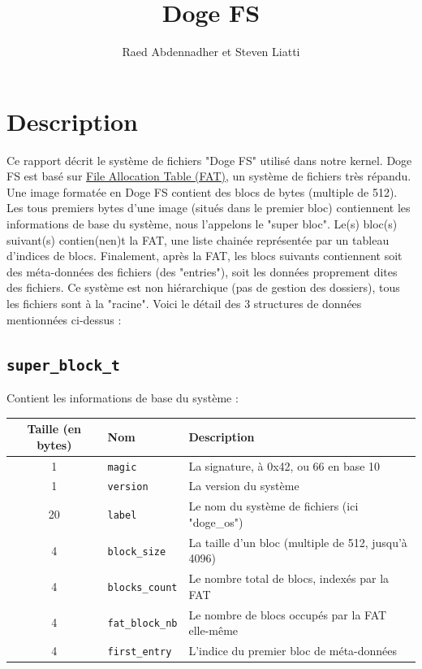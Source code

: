 \documentclass[a4paper, 12pt]{article}
\begin{document}
\title{Doge FS}
\author{Raed Abdennadher et Steven Liatti}
\maketitle

\section{Description}
Ce rapport décrit le système de fichiers "Doge FS" utilisé dans notre kernel. Doge FS est basé sur
\href{https://en.wikipedia.org/wiki/File_Allocation_Table}{File Allocation Table (FAT)}, un système
de fichiers très répandu. Une image formatée en Doge FS contient des blocs de bytes (multiple de 512).
Les tous premiers bytes d'une image (situés dans le premier bloc) contiennent les informations de base
du système, nous l'appelons le "super bloc". Le(s) bloc(s) suivant(s) contien(nen)t la FAT, une liste chainée 
représentée par un tableau d'indices de blocs. Finalement, après la FAT, les blocs suivants contiennent soit des
méta-données des fichiers (des "entries"), soit les données proprement dites des fichiers. Ce système
est non hiérarchique (pas de gestion des dossiers), tous les fichiers sont à la "racine".
Voici le détail des 3 structures de données mentionnées ci-dessus :

\subsection{\texttt{super_block_t}} Contient les informations de base du système :

\begin{tabular}{|c|l|p{.5\linewidth}|}	\hline
	\textbf{Taille (en bytes)}	& \textbf{Nom} & \textbf{Description} \\ \hline
	1	& \texttt{magic}			& La signature, à 0x42, ou 66 en base 10 				\\ \hline
	1	& \texttt{version}		& La version du système 								\\ \hline
	20	& \texttt{label}			& Le nom du système de fichiers (ici "doge\_os")			\\ \hline
	4	& \texttt{block_size}	& La taille d'un bloc (multiple de 512, jusqu'à 4096) 	\\ \hline
	4	& \texttt{blocks_count}		& Le nombre total de blocs, indexés par la FAT 			\\ \hline
	4	& \texttt{fat_block_nb}	& Le nombre de blocs occupés par la FAT elle-même 		\\ \hline
	4	& \texttt{first_entry}	& L'indice du premier bloc de méta-données				\\ \hline
\end{tabular}
\end{document}
